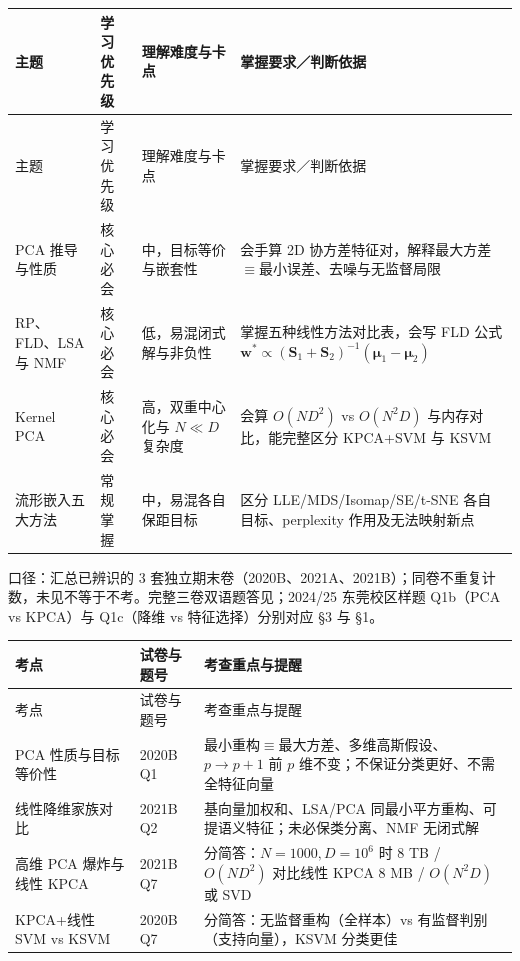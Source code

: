 \begingroup\small\setlength{\tabcolsep}{3pt}\renewcommand{\arraystretch}{1.22}
\begin{longtable}{@{}>{\raggedright\arraybackslash}p{}>{\raggedright\arraybackslash}p{}>{\raggedright\arraybackslash}p{}>{\raggedright\arraybackslash}p{}@{}}
\toprule
主题 & 学习优先级 & 理解难度与卡点 & 掌握要求／判断依据 \\
\midrule\endfirsthead
主题 & 学习优先级 & 理解难度与卡点 & 掌握要求／判断依据 \\
\midrule\endhead
\bottomrule\endfoot
PCA 推导与性质 & 核心必会 & 中，目标等价与嵌套性 & 会手算 2D 协方差特征对，解释最大方差$\equiv$最小误差、去噪与无监督局限 \\
RP、FLD、LSA 与 NMF & 核心必会 & 低，易混闭式解与非负性 & 掌握五种线性方法对比表，会写 FLD 公式 $\mathbf{w}^*\propto (\mathbf{S}_1+\mathbf{S}_2)^{-1}(\boldsymbol{\mu}_1-\boldsymbol{\mu}_2)$ \\
Kernel PCA & 核心必会 & 高，双重中心化与 $N\ll D$ 复杂度 & 会算 $O(ND^2)$ vs $O(N^2D)$ 与内存对比，能完整区分 KPCA+SVM 与 KSVM \\
流形嵌入五大方法 & 常规掌握 & 中，易混各自保距目标 & 区分 LLE/MDS/Isomap/SE/t-SNE 各自目标、perplexity 作用及无法映射新点 \\
\end{longtable}\endgroup



口径：汇总已辨识的 3 套独立期末卷（2020B、2021A、2021B）；同卷不重复计数，未见不等于不考。完整三卷双语题答见；2024/25 东莞校区样题 Q1b（PCA vs KPCA）与 Q1c（降维 vs 特征选择）分别对应 §3 与 §1。

\begingroup\small\setlength{\tabcolsep}{3pt}\renewcommand{\arraystretch}{1.22}
\begin{longtable}{@{}>{\raggedright\arraybackslash}p{}>{\raggedright\arraybackslash}p{}>{\raggedright\arraybackslash}p{}@{}}
\toprule
考点 & 试卷与题号 & 考查重点与提醒 \\
\midrule\endfirsthead
考点 & 试卷与题号 & 考查重点与提醒 \\
\midrule\endhead
\bottomrule\endfoot
PCA 性质与目标等价性 & 2020B Q1 & 最小重构$\equiv$最大方差、多维高斯假设、$p\to p+1$ 前 $p$ 维不变；不保证分类更好、不需全特征向量 \\
线性降维家族对比 & 2021B Q2 & 基向量加权和、LSA/PCA 同最小平方重构、可提语义特征；未必保类分离、NMF 无闭式解 \\
高维 PCA 爆炸与线性 KPCA & 2021B Q7 & 10 分简答：$N=1000, D=10^6$ 时 8 TB / $O(ND^2)$ 对比线性 KPCA 8 MB / $O(N^2D)$ 或 SVD \\
KPCA+线性 SVM vs KSVM & 2020B Q7 & 10 分简答：无监督重构（全样本）vs 有监督判别（支持向量），KSVM 分类更佳 \\
\end{longtable}\endgroup


